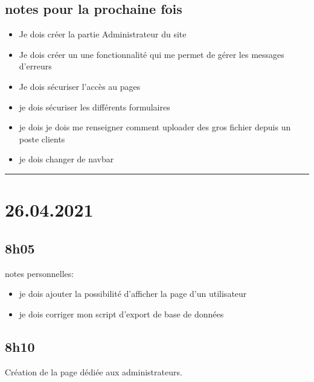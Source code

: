 \documentclass[a4paper,12pt,french]{sphinxmanual}
\begin{document}
\subsection{notes pour la prochaine fois}
\label{\detokenize{logbook:notes-pour-la-prochaine-fois}}\begin{itemize}
\item {} 
\sphinxAtStartPar
Je dois créer la partie Administrateur du site

\item {} 
\sphinxAtStartPar
Je dois créer un une fonctionnalité qui me permet de gérer les messages d’erreurs

\item {} 
\sphinxAtStartPar
Je dois sécuriser l’accès au pages

\item {} 
\sphinxAtStartPar
je dois sécuriser les différents formulaires

\item {} 
\sphinxAtStartPar
je dois je dois me renseigner comment uploader des gros fichier depuis un poste clients

\item {} 
\sphinxAtStartPar
je dois changer de navbar

\end{itemize}


\bigskip\hrule\bigskip



\section{26.04.2021}
\label{\detokenize{logbook:id26}}

\subsection{8h05}
\label{\detokenize{logbook:id27}}
\sphinxAtStartPar
notes personnelles:
\begin{itemize}
\item {} 
\sphinxAtStartPar
je dois ajouter la possibilité d’afficher la page d’un utilisateur

\item {} 
\sphinxAtStartPar
je dois corriger mon script d’export de base de données

\end{itemize}


\subsection{8h10}
\label{\detokenize{logbook:id28}}
\sphinxAtStartPar
Création de la page dédiée aux administrateurs.
\end{document}
